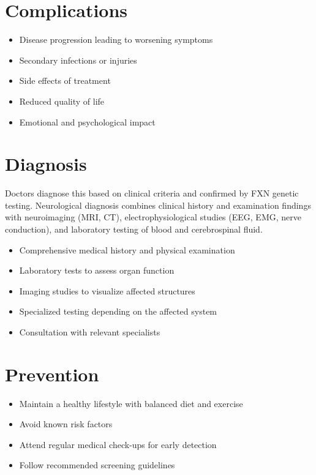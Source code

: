 \section{Complications}
\begin{itemize}[noitemsep]
  \item Disease progression leading to worsening symptoms
  \item Secondary infections or injuries
  \item Side effects of treatment
  \item Reduced quality of life
  \item Emotional and psychological impact
\end{itemize}
\section{Diagnosis}
Doctors diagnose this based on clinical criteria and confirmed by FXN genetic testing. Neurological diagnosis combines clinical history and examination findings with neuroimaging (MRI, CT), electrophysiological studies (EEG, EMG, nerve conduction), and laboratory testing of blood and cerebrospinal fluid.

\begin{itemize}[noitemsep]
  \item Comprehensive medical history and physical examination
  \item Laboratory tests to assess organ function
  \item Imaging studies to visualize affected structures
  \item Specialized testing depending on the affected system
  \item Consultation with relevant specialists
\end{itemize}
\section{Prevention}
\begin{itemize}[noitemsep]
  \item Maintain a healthy lifestyle with balanced diet and exercise
  \item Avoid known risk factors
  \item Attend regular medical check-ups for early detection
  \item Follow recommended screening guidelines
\end{itemize}
